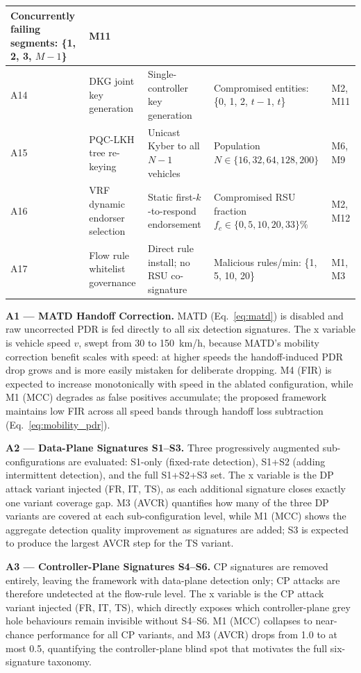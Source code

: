 \documentclass[12pt, a4paper]{report}
\newcommand{\mypar}{\vspace{0.8em}\noindent}
\begin{document}
\begin{table}[!htbp]
\begin{tabular}{|p{0.45cm}|p{2.4cm}|p{3.0cm}|p{3.3cm}|p{1.5cm}|}
Concurrently failing segments: \{1, 2, 3, $M{-}1$\} &
M11 \\
\hline
A14 &
DKG joint key generation &
Single-controller key generation &
Compromised entities: \{0, 1, 2, $t{-}1$, $t$\} &
M2, M11 \\
\hline
A15 &
PQC-LKH tree re-keying &
Unicast Kyber to all $N{-}1$ vehicles &
Population $N \in \{16, 32, 64, 128, 200\}$ &
M6, M9 \\
\hline
A16 &
VRF dynamic endorser selection &
Static first-$k$-to-respond endorsement &
Compromised RSU fraction $f_c \in \{0, 5, 10, 20, 33\}\%$ &
M2, M12 \\
\hline
A17 &
Flow rule whitelist governance &
Direct rule install; no RSU co-signature &
Malicious rules/min: \{1, 5, 10, 20\} &
M1, M3 \\
\hline
\end{tabular}
\end{table}

\mypar
\textbf{A1 --- MATD Handoff Correction.}
MATD (Eq.~\eqref{eq:matd}) is disabled and raw uncorrected PDR is fed
directly to all six detection signatures. The x variable is vehicle speed
$v$, swept from 30 to 150~km/h, because MATD's mobility correction
benefit scales with speed: at higher speeds the handoff-induced PDR drop
grows and is more easily mistaken for deliberate dropping. M4 (FIR) is
expected to increase monotonically with speed in the ablated configuration,
while M1 (MCC) degrades as false positives accumulate; the proposed
framework maintains low FIR across all speed bands through handoff loss
subtraction (Eq.~\eqref{eq:mobility_pdr}).

\mypar
\textbf{A2 --- Data-Plane Signatures S1--S3.}
Three progressively augmented sub-configurations are evaluated: S1-only
(fixed-rate detection), S1+S2 (adding intermittent detection), and the
full S1+S2+S3 set. The x variable is the DP attack variant injected
(FR, IT, TS), as each additional signature closes exactly one variant
coverage gap. M3 (AVCR) quantifies how many of the three DP variants
are covered at each sub-configuration level, while M1 (MCC) shows the
aggregate detection quality improvement as signatures are added;
S3 is expected to produce the largest AVCR step for the TS variant.

\mypar
\textbf{A3 --- Controller-Plane Signatures S4--S6.}
CP signatures are removed entirely, leaving the framework with data-plane
detection only; CP attacks are therefore undetected at the flow-rule level.
The x variable is the CP attack variant injected (FR, IT, TS), which
directly exposes which controller-plane grey hole behaviours remain
invisible without S4--S6. M1 (MCC) collapses to near-chance performance
for all CP variants, and M3 (AVCR) drops from 1.0 to at most 0.5,
quantifying the controller-plane blind spot that motivates the full
six-signature taxonomy.
\end{document}
